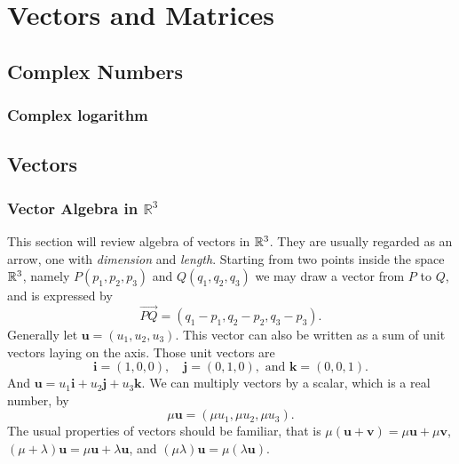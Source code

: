 \documentclass[main.tex]{subfiles}
\begin{document}
\chapter{Vectors and Matrices}
	\section{Complex Numbers}
		\subsection{Complex logarithm}
		
	\section{Vectors}
		\subsection{Vector Algebra in $\mathbb{R}^3$}
			This section will review algebra of vectors in $\mathbb R^3$. They are usually regarded as an arrow, one with \textit{dimension} and \textit{length}. Starting from two points inside the space $\mathbb R^3$, namely $P(p_1, p_2, p_3)$ and $Q(q_1, q_2, q_3)$ we may draw a vector from $P$ to $Q$, and is expressed by
			\begin{equation*}
				\overrightarrow{PQ} = (q_1 - p_1, q_2 - p_2, q_3 - p_3).
			\end{equation*}
			Generally let $\mathbf{u} = (u_1, u_2, u_3)$. This vector can also be written as a sum of unit vectors laying on the axis. Those unit vectors are
			\begin{equation*}
				\mathbf{i} = (1, 0, 0),\quad \mathbf{j} = (0, 1, 0),\text{ and } \mathbf{k} = (0, 0, 1).
			\end{equation*}
			And $\mathbf{u} = u_1\mathbf{i} + u_2\mathbf{j} +  u_3\mathbf{k}$. We can multiply vectors by a scalar, which is a real number, by
			\begin{equation*}
				\mu\mathbf{u} = (\mu u_1, \mu u_2, \mu u_3).
			\end{equation*}
			The usual properties of vectors should be familiar, that is $\mu(\mathbf{u} + \mathbf{v}) =\mu\mathbf{u} + \mu\mathbf{v}$, $(\mu + \lambda)\mathbf{u} = \mu\mathbf{u} + \lambda\mathbf{u}$, and $(\mu\lambda)\mathbf{u} = \mu(\lambda\mathbf{u})$. 
\end{document}
